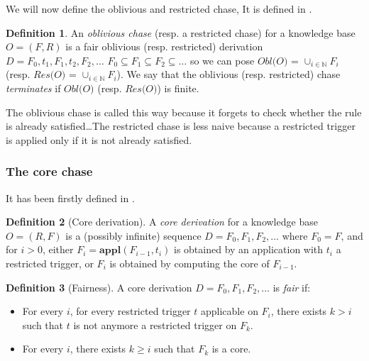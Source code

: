 \documentclass{article}
\theoremstyle{definition}
\newtheorem{definition}{Definition}[section]
\theoremstyle{remark}
\def \N {\mathbb N}
\newcommand{\Appl}{\textbf{appl}}
\begin{document}
We will now define the oblivious and restricted chase, It is defined in \cite{obl_res}.


\begin{definition}
An \emph{oblivious chase} (resp. a restricted chase) for a knowledge base $O= (F,R)$ is a fair oblivious (resp. restricted) derivation $D=F_0,t_1,F_1,t_2,F_2,\ldots$ $F_0 \subseteq F_1 \subseteq F_2 \subseteq \ldots$ so we can pose \emph{$\textit{Obl(O)}$} = $\cup_{i \in \N}F_i$ (resp. \emph{$\textit{Res(O)}$} = $\cup_{i \in \N}F_i$).
We say that the oblivious (resp. restricted) chase \emph{terminates} if $\textit{Obl(O)}$ (resp. $\textit{Res(O)}$) is finite.
\end{definition}


The oblivious chase is called this way because it forgets to check whether the rule is already satisfied\ldots The restricted chase is less naive because a restricted trigger is applied only if it is not already satisfied.


\subsubsection{The core chase}

It has been firstly defined in \cite{core_chase}.

\begin{definition}[Core derivation]
A \emph{core derivation} for a knowledge base $O = (R,F)$ is a (possibly infinite) sequence $D = F_0, F_1, F_2, \ldots$ where $F_0 = F$, and for $i >0$, either $F_{i}= \Appl(F_{i-1},t_i)$ is obtained by an application with $t_i$ a restricted trigger, or $F_i$ is obtained by computing the core of $F_{i-1}$. 
\end{definition} 

\begin{definition}[Fairness]
A core derivation $D=F_0,F_1,F_2,\ldots$ is \emph{fair} if:
\begin{itemize}
\item For every $i$, for every restricted trigger $t$ applicable on $F_i$, there exists $k > i$ such that $t$ is not anymore a restricted trigger on $F_k$.
\item For every $i$, there exists $k \geq i$ such that $F_k$ is a core.

\end{itemize}
\end{definition}
\end{document}
